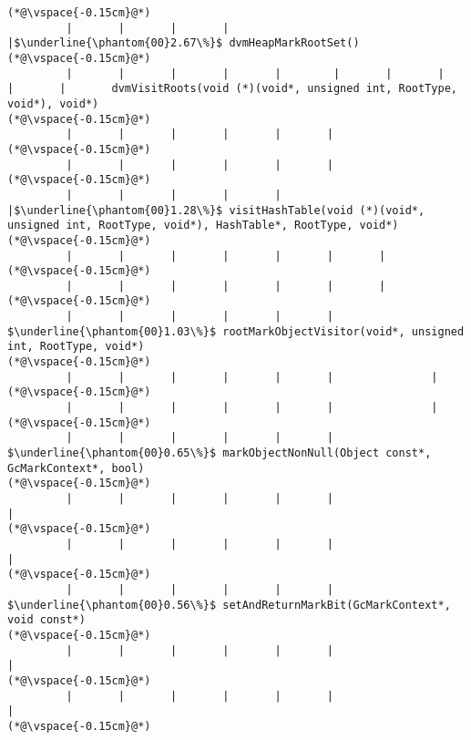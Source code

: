 \begin{lstlisting}[caption=NewDirectByteBuffer, label=profile:C2JNewDirectBuffer-512, numberbychapter=true, frame=lines, float, floatplacement=t]
(*@\vspace{-0.15cm}@*)
         |       |       |       |       |$\underline{\phantom{00}2.67\%}$ dvmHeapMarkRootSet()
(*@\vspace{-0.15cm}@*)
         |       |       |       |       |        |       |       |       |       |       dvmVisitRoots(void (*)(void*, unsigned int, RootType, void*), void*)
(*@\vspace{-0.15cm}@*)
         |       |       |       |       |       |
(*@\vspace{-0.15cm}@*)
         |       |       |       |       |       |
(*@\vspace{-0.15cm}@*)
         |       |       |       |       |       |$\underline{\phantom{00}1.28\%}$ visitHashTable(void (*)(void*, unsigned int, RootType, void*), HashTable*, RootType, void*)
(*@\vspace{-0.15cm}@*)
         |       |       |       |       |       |       |
(*@\vspace{-0.15cm}@*)
         |       |       |       |       |       |       |
(*@\vspace{-0.15cm}@*)
         |       |       |       |       |       |        $\underline{\phantom{00}1.03\%}$ rootMarkObjectVisitor(void*, unsigned int, RootType, void*)
(*@\vspace{-0.15cm}@*)
         |       |       |       |       |       |               |
(*@\vspace{-0.15cm}@*)
         |       |       |       |       |       |               |
(*@\vspace{-0.15cm}@*)
         |       |       |       |       |       |                $\underline{\phantom{00}0.65\%}$ markObjectNonNull(Object const*, GcMarkContext*, bool)
(*@\vspace{-0.15cm}@*)
         |       |       |       |       |       |                       |
(*@\vspace{-0.15cm}@*)
         |       |       |       |       |       |                       |
(*@\vspace{-0.15cm}@*)
         |       |       |       |       |       |                        $\underline{\phantom{00}0.56\%}$ setAndReturnMarkBit(GcMarkContext*, void const*)
(*@\vspace{-0.15cm}@*)
         |       |       |       |       |       |                               |
(*@\vspace{-0.15cm}@*)
         |       |       |       |       |       |                               |
(*@\vspace{-0.15cm}@*)

\end{lstlisting}
